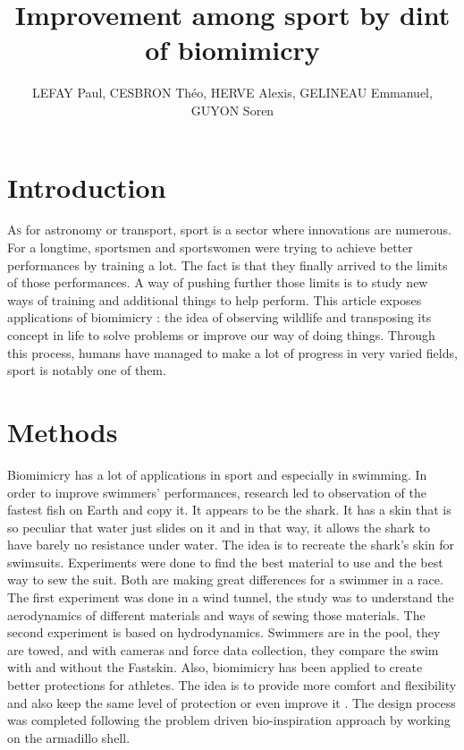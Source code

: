 \documentclass[twoside,twocolumn]{article}                          %
\title{Improvement among sport by dint of biomimicry}               %
\author{LEFAY Paul, CESBRON Théo, HERVE Alexis, GELINEAU Emmanuel, GUYON Soren}                                              %
\begin{document}
\renewcommand\thesection{\Roman{section}}                           %
\renewcommand\thesubsection{\roman{subsection}}                     %


\cfoot{\thepage}

\maketitle{}										                                    %

\newpage
\section{Introduction}
\lettrine[nindent=0em,lines=2]{A} s for astronomy or transport, sport is a sector where innovations are numerous. For a longtime, sportsmen and sportswomen were trying to achieve better performances by training a lot. The fact is that they finally arrived to the limits of those performances. A way of pushing further those limits is to study new ways of training and additional things to help perform. This article exposes applications of biomimicry : the idea of observing wildlife and transposing its concept in life to solve problems or improve our way of doing things. Through this process, humans have managed to make a lot of progress in very varied fields, sport is notably one of them.


\section{Methods}
Biomimicry has a lot of applications in sport and especially in swimming.
In order to improve swimmers’ performances, research led to observation of the fastest fish on Earth and copy it. It appears to be the shark. It has a skin that is so peculiar that water just slides on it and in that way, it allows the shark to have barely no resistance under water. The idea is to recreate the shark’s skin for swimsuits. Experiments were done to find the best material to use and the best way to sew the suit. Both are making great differences for a swimmer in a race. The first experiment was done in a wind tunnel, the study was to understand the aerodynamics of different materials and ways of sewing those materials. The second experiment is based on hydrodynamics. Swimmers are in the pool, they are towed, and with cameras and force data collection, they compare the swim with and without the Fastskin.
Also, biomimicry has been applied to create better protections for athletes. The idea is to provide more comfort and flexibility and also keep the same level of protection or even improve it . The design process was completed following the problem driven bio-inspiration approach by working on the armadillo shell\cite{armadillo}.
\end{document}
